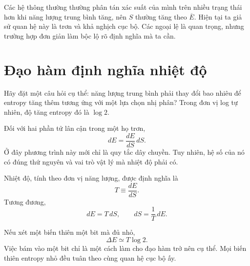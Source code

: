 Các hệ thông thường thường phân tán xác suất của mình trên nhiều trạng thái hơn khi năng lượng trung bình tăng, nên \(S\) thường tăng theo \(\overline E\). Hiện tại ta giả sử quan hệ này là trơn và khả nghịch cục bộ. Các ngoại lệ là quan trọng, nhưng trường hợp đơn giản làm bộc lộ rõ định nghĩa mà ta cần.

\section{Đạo hàm định nghĩa nhiệt độ}

Hãy đặt một câu hỏi cụ thể: năng lượng trung bình phải thay đổi bao nhiêu để entropy tăng thêm tương ứng với một lựa chọn nhị phân? Trong đơn vị log tự nhiên, độ tăng entropy đó là \(\log2\).

Đối với hai phần tử lân cận trong một họ trơn,
\begin{equation}
 dE=\frac{dE}{dS}\,dS.
 \label{eq:sm2-differential-identity}
\end{equation}
Ở đây phương trình này mới chỉ là quy tắc dây chuyền. Tuy nhiên, hệ số của nó có đúng thứ nguyên và vai trò vật lý mà nhiệt độ phải có.

\begin{definition}
Nhiệt độ, tính theo đơn vị năng lượng, được định nghĩa là
\begin{equation}
 T\equiv\frac{dE}{dS}.
 \label{eq:sm2-temperature-definition}
\end{equation}
Tương đương,
\begin{equation}
 dE=T\,dS,
 \qquad
 dS=\frac{1}{T}\,dE.
 \label{eq:sm2-fundamental-differentials}
\end{equation}
\end{definition}

Nếu xét một biến thiên một bit mà đủ nhỏ,
\begin{equation}
 \Delta E\simeq T\log2.
 \label{eq:sm2-one-bit-energy}
\end{equation}
Việc bám vào một bit chỉ là một cách làm cho đạo hàm trở nên cụ thể. Mọi biến thiên entropy nhỏ đều tuân theo cùng quan hệ cục bộ ấy.

\begin{classroomqa}
\end{classroomqa}

